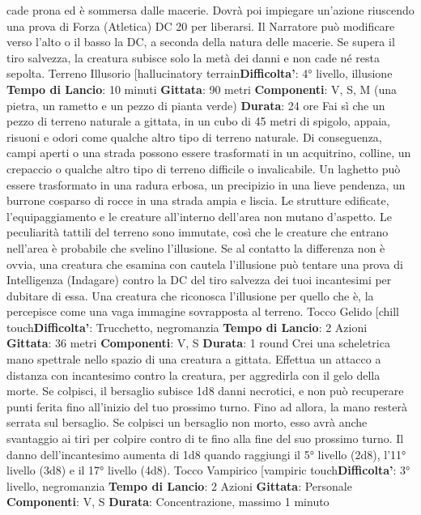 \begin{multicols}{2}
cade prona ed è sommersa dalle macerie. Dovrà poi
impiegare un’azione riuscendo una prova di Forza
(Atletica) DC 20 per liberarsi. Il Narratore può modificare
verso l’alto o il basso la DC, a seconda della natura
delle macerie. Se supera il tiro salvezza, la creatura
subisce solo la metà dei danni e non cade né resta
sepolta.
Terreno Illusorio
[hallucinatory terrain\textbf{Difficolta'}:
4° livello, illusione
\textbf{Tempo di Lancio}: 10 minuti
\textbf{Gittata}: 90 metri
\textbf{Componenti}: V, S, M (una pietra, un rametto e un
pezzo di pianta verde)
\textbf{Durata}: 24 ore
Fai sì che un pezzo di terreno naturale a gittata, in un
cubo di 45 metri di spigolo, appaia, risuoni e odori come
qualche altro tipo di terreno naturale. Di conseguenza,
campi aperti o una strada possono essere trasformati in
un acquitrino, colline, un crepaccio o qualche altro tipo
di terreno difficile o invalicabile. Un laghetto può essere
trasformato in una radura erbosa, un precipizio in una
lieve pendenza, un burrone cosparso di rocce in una
strada ampia e liscia. Le strutture edificate,
l’equipaggiamento e le creature all’interno dell’area non
mutano d’aspetto.
Le peculiarità tattili del terreno sono immutate, così che
le creature che entrano nell’area è probabile che
svelino l’illusione. Se al contatto la differenza non è
ovvia, una creatura che esamina con cautela l’illusione
può tentare una prova di Intelligenza (Indagare) contro
la DC del tiro salvezza dei tuoi incantesimi per dubitare
di essa. Una creatura che riconosca l’illusione per
quello che è, la percepisce come una vaga immagine
sovrapposta al terreno.
Tocco Gelido
[chill touch\textbf{Difficolta'}:
Trucchetto, negromanzia
\textbf{Tempo di Lancio}: 2 Azioni
\textbf{Gittata}: 36 metri
\textbf{Componenti}: V, S
\textbf{Durata}: 1 round
Crei una scheletrica mano spettrale nello spazio di una
creatura a gittata. Effettua un attacco a distanza con
incantesimo contro la creatura, per aggredirla con il
gelo della morte. Se colpisci, il bersaglio subisce 1d8
danni necrotici, e non può recuperare punti ferita fino
all’inizio del tuo prossimo turno. Fino ad allora, la mano
resterà serrata sul bersaglio.
Se colpisci un bersaglio non morto, esso avrà anche
svantaggio ai tiri per colpire contro di te fino alla fine del
suo prossimo turno.
Il danno dell’incantesimo aumenta di 1d8 quando
raggiungi il 5° livello (2d8), l’11° livello (3d8) e il 17°
livello (4d8).
Tocco Vampirico
[vampiric touch\textbf{Difficolta'}:
3° livello, negromanzia
\textbf{Tempo di Lancio}: 2 Azioni
\textbf{Gittata}: Personale
\textbf{Componenti}: V, S
\textbf{Durata}: Concentrazione, massimo 1 minuto

\end{multicols}
